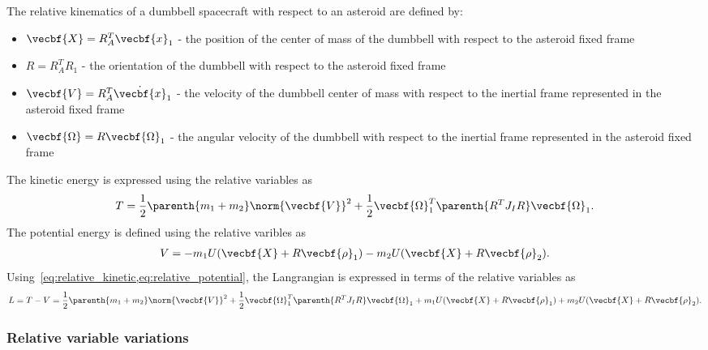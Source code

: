 \documentclass[11pt, reqno]{article}    %
\begin{document}
The relative kinematics of a dumbbell spacecraft with respect to an asteroid are defined by:
\begin{itemize}
    \item \( \vecbf{X} = R_A^T \vecbf{x}_1\) - the position of the center of mass of the dumbbell with respect to the asteroid fixed frame
    \item \( R = R_A^T R_1\) - the orientation of the dumbbell with respect to the asteroid fixed frame
    \item \( \vecbf{V} = R_A^T \dot{\vecbf{x}}_1 \) - the velocity of the dumbbell center of mass with respect to the inertial frame represented in the asteroid fixed frame
    \item \( \vecbf{\Omega} = R \vecbf{\Omega}_1\) - the angular velocity of the dumbbell with respect to the inertial frame represented in the asteroid fixed frame
\end{itemize}
The kinetic energy is expressed using the relative variables as
\begin{align}\label{eq:relative_kinetic}
    T = \frac{1}{2} \parenth{m_1 + m_2} \norm{\vecbf{V}}^2 + \frac{1}{2} \vecbf{\Omega}_1^T \parenth{R^T J_I R} \vecbf{\Omega}_1 .
\end{align}
The potential energy is defined using the relative varibles as
\begin{align}\label{eq:relative_potential}
    V = -m_1 U(\vecbf{X} + R \vecbf{\rho}_1) - m_2 U(\vecbf{X}+R \vecbf{\rho}_2).
\end{align}
Using~\cref{eq:relative_kinetic,eq:relative_potential}, the Langrangian is expressed in terms of the relative variables as 
\begin{align}
    L = T-V = \frac{1}{2} \parenth{m_1 + m_2} \norm{\vecbf{V}}^2 + \frac{1}{2} \vecbf{\Omega}_1^T \parenth{R^T J_I R} \vecbf{\Omega}_1 +m_1 U(\vecbf{X} + R \vecbf{\rho}_1) + m_2 U(\vecbf{X}+R \vecbf{\rho}_2) .
\end{align}

\subsubsection{Relative variable variations}\label{ssec:relative_variations}
\end{document}
